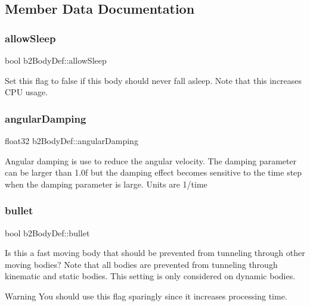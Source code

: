 \subsection{Member Data Documentation}
\mbox{\label{structb2_body_def_a0765068172e521ed63cb34084c59c003}} 
\subsubsection{\texorpdfstring{allow\+Sleep}{allowSleep}}
{\footnotesize\ttfamily bool b2\+Body\+Def\+::allow\+Sleep}

Set this flag to false if this body should never fall asleep. Note that this increases C\+PU usage. \mbox{\label{structb2_body_def_a01b8dc8ad9f0962efef9e4a8e836feb6}} 
\subsubsection{\texorpdfstring{angular\+Damping}{angularDamping}}
{\footnotesize\ttfamily float32 b2\+Body\+Def\+::angular\+Damping}

Angular damping is use to reduce the angular velocity. The damping parameter can be larger than 1.\+0f but the damping effect becomes sensitive to the time step when the damping parameter is large. Units are 1/time \mbox{\label{structb2_body_def_a7c0047c9a98a1d20614eeddcdbce7586}} 
\subsubsection{\texorpdfstring{bullet}{bullet}}
{\footnotesize\ttfamily bool b2\+Body\+Def\+::bullet}

Is this a fast moving body that should be prevented from tunneling through other moving bodies? Note that all bodies are prevented from tunneling through kinematic and static bodies. This setting is only considered on dynamic bodies. \begin{DoxyWarning}{Warning}
You should use this flag sparingly since it increases processing time. 
\end{DoxyWarning}
\mbox{\label{structb2_body_def_a728f6df3be7dedb331455105e3659d46}} 
